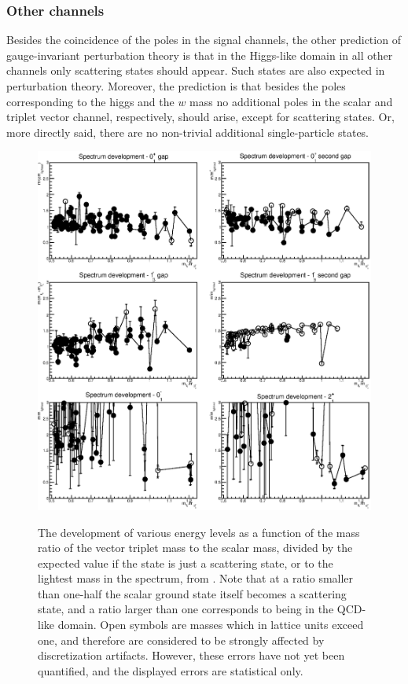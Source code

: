 \documentclass[final,twoside,12pt]{article}
\newcommand*{\1}{1\!\!\!\bot}
\begin{document}
\subsubsection{Other channels}\label{sss:other}

Besides the coincidence of the poles in the signal channels, the other prediction of gauge-invariant perturbation theory is that in the Higgs-like domain in all other channels only scattering states should appear. Such states are also expected in perturbation theory. Moreover, the prediction is that besides the poles corresponding to the higgs and the $w$ mass no additional poles in the scalar and triplet vector channel, respectively, should arise, except for scattering states. Or, more directly said, there are no non-trivial additional single-particle states.

\begin{figure}
\includegraphics[width=\linewidth]{spectrum}\\
\caption{\label{fig:spectrum}The development of various energy levels as a function of the mass ratio of the vector triplet mass to the scalar mass, divided by the expected value if the state is just a scattering state, or to the lightest mass in the spectrum, from \cite{Maas:2014pba,Maas:unpublished}. Note that at a ratio smaller than one-half the scalar ground state itself becomes a scattering state, and a ratio larger than one corresponds to being in the QCD-like domain. Open symbols are masses which in lattice units exceed one, and therefore are considered to be strongly affected by discretization artifacts. However, these errors have not yet been quantified, and the displayed errors are statistical only.}
\end{figure}
\end{document}
